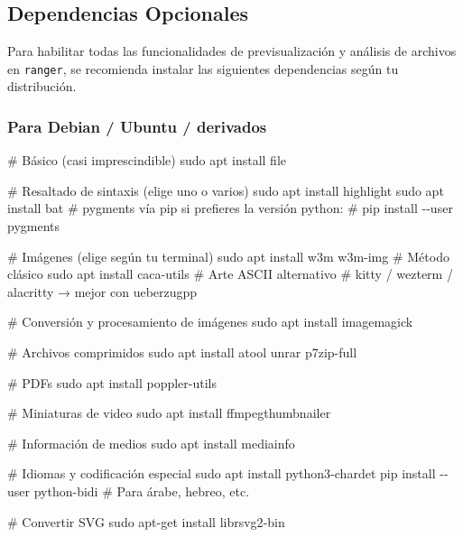 \documentclass[
  doc,
  floatsintext,
  longtable,
  a4paper,
  nolmodern,
  notxfonts,
  notimes,
  12pt,
  colorlinks=true,linkcolor=blue,citecolor=blue,urlcolor=blue]{apa7}
\newenvironment{Shaded}{\begin{snugshade}}{\end{snugshade}}
\newcommand{\AttributeTok}[1]{\textcolor[rgb]{0.40,0.45,0.13}{#1}}
\newcommand{\CommentTok}[1]{\textcolor[rgb]{0.37,0.37,0.37}{#1}}
\newcommand{\ExtensionTok}[1]{\textcolor[rgb]{0.00,0.23,0.31}{#1}}
\newcommand{\FunctionTok}[1]{\textcolor[rgb]{0.28,0.35,0.67}{#1}}
\newcommand{\NormalTok}[1]{\textcolor[rgb]{0.00,0.23,0.31}{#1}}
\begin{document}
\subsection{Dependencias Opcionales}\label{dependencias-opcionales}

Para habilitar todas las funcionalidades de previsualización y análisis
de archivos en \texttt{ranger}, se recomienda instalar las siguientes
dependencias según tu distribución.

\subsubsection{Para Debian / Ubuntu /
derivados}\label{para-debian-ubuntu-derivados}

\begin{Shaded}
\begin{Highlighting}[]
\CommentTok{\# Básico (casi imprescindible)}
\FunctionTok{sudo}\NormalTok{ apt install file}

\CommentTok{\# Resaltado de sintaxis (elige uno o varios)}
\FunctionTok{sudo}\NormalTok{ apt install highlight}
\FunctionTok{sudo}\NormalTok{ apt install bat}
\CommentTok{\# pygments vía pip si prefieres la versión python:}
\CommentTok{\# pip install {-}{-}user pygments}

\CommentTok{\# Imágenes (elige según tu terminal)}
\FunctionTok{sudo}\NormalTok{ apt install w3m w3m{-}img           }\CommentTok{\# Método clásico}
\FunctionTok{sudo}\NormalTok{ apt install caca{-}utils            }\CommentTok{\# Arte ASCII alternativo}
\CommentTok{\# kitty / wezterm / alacritty → mejor con ueberzugpp}

\CommentTok{\# Conversión y procesamiento de imágenes}
\FunctionTok{sudo}\NormalTok{ apt install imagemagick}

\CommentTok{\# Archivos comprimidos}
\FunctionTok{sudo}\NormalTok{ apt install atool unrar p7zip{-}full}

\CommentTok{\# PDFs}
\FunctionTok{sudo}\NormalTok{ apt install poppler{-}utils}

\CommentTok{\# Miniaturas de video}
\FunctionTok{sudo}\NormalTok{ apt install ffmpegthumbnailer}

\CommentTok{\# Información de medios}
\FunctionTok{sudo}\NormalTok{ apt install mediainfo}

\CommentTok{\# Idiomas y codificación especial}
\FunctionTok{sudo}\NormalTok{ apt install python3{-}chardet}
\ExtensionTok{pip}\NormalTok{ install }\AttributeTok{{-}{-}user}\NormalTok{ python{-}bidi        }\CommentTok{\# Para árabe, hebreo, etc.}

\CommentTok{\# Convertir SVG}
\FunctionTok{sudo}\NormalTok{ apt{-}get install librsvg2{-}bin}
\end{Highlighting}
\end{Shaded}
\end{document}
